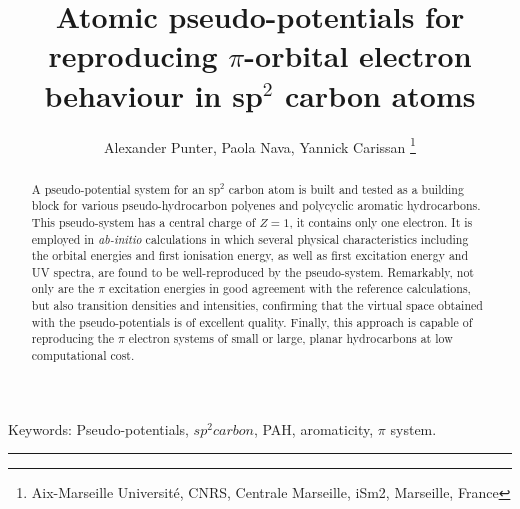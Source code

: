 \documentclass[12pt]{article}
\title{Atomic pseudo-potentials for reproducing $\pi$-orbital electron behaviour in sp$^2$ carbon atoms}
\author{Alexander Punter, Paola Nava, Yannick Carissan \thanks{Aix-Marseille Universit\'e, CNRS, Centrale Marseille, iSm2, Marseille, France}}
\newenvironment{wileykeywords}{\textsf{Keywords:}\hspace{\stretch{1}}}{\hspace{\stretch{1}}\rule{1ex}{1ex}}
\begin{document}
\maketitle

\begin{abstract}
A pseudo-potential system for an sp\(^{2}\) carbon atom is built and tested as a building block for various pseudo-hydrocarbon polyenes and polycyclic aromatic hydrocarbons.  
This pseudo-system has a central charge of $Z=1$, it contains only one electron.
It is employed in \textsl{ab-initio} calculations in which several physical characteristics 
including the orbital energies and first ionisation energy, as well as first excitation energy and UV spectra, are found to be well-reproduced by the pseudo-system. 
Remarkably, not only are the $\pi$ excitation energies in good agreement with the reference calculations, but also transition
densities and intensities, confirming that the virtual space obtained with the pseudo-potentials is of excellent quality.
Finally, this approach is capable of reproducing the $\pi$ electron systems of small or large, planar hydrocarbons at low computational cost.
\end{abstract}

\begin{wileykeywords}
Pseudo-potentials, $sp^2 carbon$, PAH, aromaticity, $\pi$ system.
\end{wileykeywords}

\clearpage
% 


\makeatletter
\renewcommand\@biblabel[1]{#1.}
\makeatother
\end{document}
